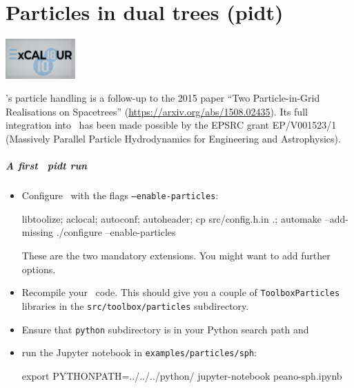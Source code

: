 \chapter{Particles in dual trees (pidt)}
\label{section:pidt}


 \begin{center}
  \includegraphics[width=0.2\textwidth]{61_pidt/ExCALIBUR.png}
 \end{center}


\noindent
\Peano's particle handling is a follow-up to the 2015 paper ``Two
Particle-in-Grid Realisations on Spacetrees''
(\url{https://arxiv.org/abs/1508.02435}).
 Its full integration into \Peano\ has been made possible by the EPSRC grant 
 EP/V001523/1 (Massively Parallel Particle Hydrodynamics for Engineering and
 Astrophysics).





\begin{framed}
\paragraph*{A first \ExaHyPE\ pidt run}
\begin{itemize}
  \item Configure \Peano\ with the flags \texttt{--enable-particles}:
  \begin{code}
libtoolize; aclocal; autoconf; autoheader; cp src/config.h.in .; automake --add-missing
./configure --enable-particles
  \end{code}
   These are the two mandatory extensions. You might want to add further options.
  \item Recompile your \Peano\ code. This should give you a couple of
  \texttt{ToolboxParticles} libraries in the \texttt{src/toolbox/particles}
  subdirectory.
  \item Ensure that \texttt{python} subdirectory is in your Python search path
  and
  \item run the Jupyter notebook in \texttt{examples/particles/sph}: 
  \begin{code}
export PYTHONPATH=../../../python/
jupyter-notebook peano-sph.ipynb
  \end{code}
\end{itemize}
\end{framed}


